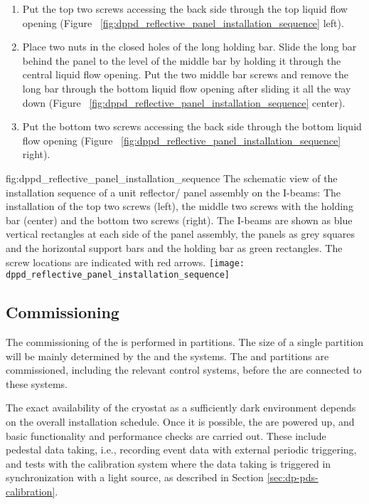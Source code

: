 \begin{enumerate}
\item Put the top two screws accessing the back side through the top liquid flow opening (Figure~ \ref{fig:dppd_reflective_panel_installation_sequence}  left).
\item Place two nuts in the closed holes of the long holding bar. Slide the long bar behind the panel to the level of the middle bar by holding it through the central liquid flow opening. Put the two middle bar screws and remove the long bar through the bottom liquid flow opening after sliding it all the way down (Figure~ \ref{fig:dppd_reflective_panel_installation_sequence}  center).
\item Put the bottom two screws accessing the back side through the bottom liquid flow opening (Figure~ \ref{fig:dppd_reflective_panel_installation_sequence}  right).
\end{enumerate}

\begin{dunefigure}{fig:dppd_reflective_panel_installation_sequence}
{The schematic view of the installation sequence of a unit reflector/ panel assembly on the  I-beams: The installation of the top two screws (left), the middle two screws with the holding bar (center) and the bottom two screws (right). The I-beams are shown as blue vertical rectangles at each side of the panel assembly, the panels as grey squares and the horizontal support bars and the holding bar as green rectangles. The screw locations are indicated with red arrows.}
\texttt{[image: dppd\_reflective\_panel\_installation\_sequence]}
\end{dunefigure}

\subsection{Commissioning}
\label{subsec:dp-pds-commissioning}

The commissioning of the  is performed in partitions. The size of a single partition will be mainly determined by the  and the  systems. The  and  partitions are commissioned, including the relevant control systems, before the  are connected to these systems.

The exact availability of the cryostat as a sufficiently dark environment depends on the overall installation schedule. Once it is possible, the  are powered up, and basic functionality and performance checks are carried out. These include pedestal data taking, i.e., recording event data with external periodic triggering, and tests with the calibration system where the data taking is triggered in synchronization with a light source, as described in Section \ref{sec:dp-pds-calibration}.

